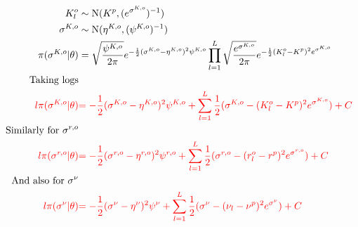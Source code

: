 \begin{align*}
K_{l}^o &\sim \operatorname{N}(K^p, (e^{ \sigma^{K,o} })^{-1} )\\
\sigma^{K,o} &\sim \operatorname{N}(\eta^{K,o}, (\psi^{K,o})^{-1} )\\
\pi(\sigma^{K,o}|\theta)&=
\sqrt{\frac{\psi^{K,o}}{2\pi}} e^{-\frac{1}{2}(\sigma^{K,o}-\eta^{K,o})^{2}\psi^{K,o} }
\prod_{l=1}^{L}
\sqrt{\frac{e^{ \sigma^{K,o} }}{2\pi}} e^{-\frac{1}{2}(K_{l}^o-K^p)^{2} e^{ \sigma^{K,o} }}\\
\text{Taking logs}\\
\color{red}{l\pi(\sigma^{K,o}|\theta)}&
\color{red}{
=-\frac{1}{2}(\sigma^{K,o}-\eta^{K,o})^{2}\psi^{K,o}
+
\sum_{l=1}^{L}\frac{1}{2}(\sigma^{K,o} -(K_{l}^o-K^p)^{2}e^{ \sigma^{K,o} })
+C
}\\
\text{Similarly for $\sigma^{r,o}$}\\
\color{red}{l\pi(\sigma^{r,o}|\theta)}&
\color{red}{
=-\frac{1}{2}(\sigma^{r,o}-\eta^{r,o})^{2}\psi^{r,o}
+
\sum_{l=1}^{L}\frac{1}{2}(\sigma^{r,o} -(r_{l}^o-r^p)^{2}e^{ \sigma^{r,o} })
+C
}\\
\text{And also for $\sigma^{\nu}$}\\
\color{red}{l\pi(\sigma^{\nu}|\theta)}&
\color{red}{
=-\frac{1}{2}(\sigma^{\nu}-\eta^{\nu})^{2}\psi^{\nu}
+
\sum_{l=1}^{L}\frac{1}{2}(\sigma^{\nu} -(\nu_{l}-\nu^p)^{2}e^{ \sigma^{\nu} })
+C
}
\end{align*}